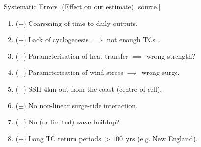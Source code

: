 \begin{frame}{Systematic Errors}
[(Effect on our estimate), source.]
\begin{enumerate}
\item ($-$) Coarsening of time to daily outputs.
\item ($-$) Lack of cyclogenesis  $\implies$ not enough TCs~\cite{tomassini2017interaction, williams2018met, FurtherInfo}.
\item ($\pm$) Parameterisation of heat transfer $\implies$ wrong strength?
\item ($\pm$) Parameterisation of wind stress $\implies$ wrong surge.
\item ($-$) SSH 4km out from the coast (centre of cell).
\item ($\pm$) No non-linear surge-tide interaction.
\item ($-$) No (or limited) wave buildup?
\item ($-$) Long TC return periods $> 100$~yrs (e.g. New England).
\end{enumerate}

\end{frame}
